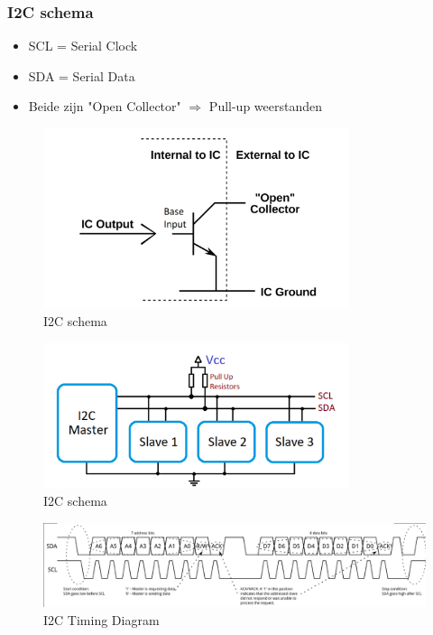 \documentclass{article}
\begin{document}
\subsubsection{I2C schema}
\begin{itemize}
    \item SCL = Serial Clock
    \item SDA = Serial Data
    \item Beide zijn "Open Collector" $\Rightarrow$ Pull-up weerstanden
\end{itemize}

\begin{figure}[H]
    \centering
    \includegraphics[width=0.8\textwidth]{Screenshot_20200330_120948.png}
    \caption{I2C schema}
\end{figure}


\begin{figure}[H]
    \centering
    \includegraphics[width=0.8\textwidth]{Screenshot_20200330_114601.png}
    \caption{I2C schema}
\end{figure}

\begin{figure}[H]
    \centering
    \includegraphics[width=\textwidth]{Screenshot_20200330_114819.png}
    \caption{I2C Timing Diagram}
\end{figure}
\end{document}
